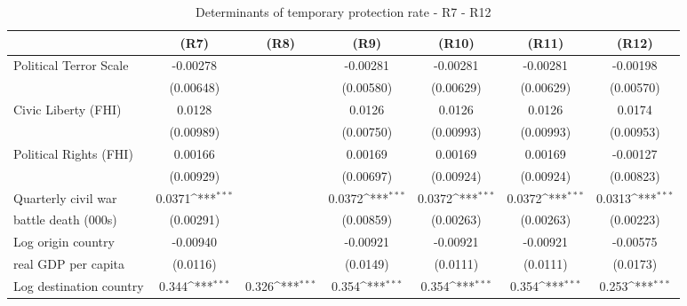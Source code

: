 \begin{table}[!ht]\centering \scriptsize
\def\sym#1{\ifmmode^{#1}\else\(^{#1}\)\fi}
\caption{Determinants of temporary protection rate - R7 - R12}
\begin{tabular}{l*{6}{c}}
\hline\hline
                    &\multicolumn{1}{c}{(R7)}&\multicolumn{1}{c}{(R8)}&\multicolumn{1}{c}{(R9)}&\multicolumn{1}{c}{(R10)}&\multicolumn{1}{c}{(R11)}&\multicolumn{1}{c}{(R12)}\\    
\hline
Political Terror Scale&    -0.00278         &                     &    -0.00281         &    -0.00281         &    -0.00281         &    -0.00198         \\
                    &   (0.00648)         &                     &   (0.00580)         &   (0.00629)         &   (0.00629)         &   (0.00570)         \\
[0,5em]
Civic Liberty (FHI) &      0.0128         &                     &      0.0126         &      0.0126         &      0.0126         &      0.0174         \\
                    &   (0.00989)         &                     &   (0.00750)         &   (0.00993)         &   (0.00993)         &   (0.00953)         \\
[0,5em]
Political Rights (FHI)&     0.00166         &                     &     0.00169         &     0.00169         &     0.00169         &    -0.00127         \\
                    &   (0.00929)         &                     &   (0.00697)         &   (0.00924)         &   (0.00924)         &   (0.00823)         \\
[0,5em]
Quarterly civil war &      0.0371\sym{***}&                     &      0.0372\sym{***}&      0.0372\sym{***}&      0.0372\sym{***}&      0.0313\sym{***}\\
battle death (000s)                    &   (0.00291)         &                     &   (0.00859)         &   (0.00263)         &   (0.00263)         &   (0.00223)         \\
[0,5em]
Log origin country &    -0.00940         &                     &    -0.00921         &    -0.00921         &    -0.00921         &    -0.00575         \\
real GDP per capita                    &    (0.0116)         &                     &    (0.0149)         &    (0.0111)         &    (0.0111)         &    (0.0173)         \\
[0,5em]
Log destination country &       0.344\sym{***}&       0.326\sym{***}&       0.354\sym{***}&       0.354\sym{***}&       0.354\sym{***}&       0.253\sym{***}\\

\end{tabular}
\end{table}

